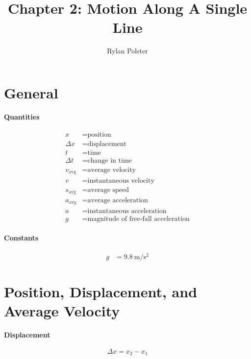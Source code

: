 \documentclass{article}
\title{Chapter 2: Motion Along A Single Line}
\author{Rylan Polster}
\begin{document}
    \maketitle
    
    \section*{General}

        \paragraph{Quantities}
        \begin{align}
            x &= \text{position} \nonumber\\
            \Delta x &= \text{displacement} \nonumber\\
            t &= \text{time} \nonumber\\
            \Delta t &= \text{change in time} \nonumber\\
            v_{\text{avg}} &= \text{average velocity} \nonumber\\
            v &= \text{instantaneous velocity} \nonumber\\
            s_{\text{avg}} &= \text{average speed} \nonumber\\
            a_{\text{avg}} &= \text{average acceleration} \nonumber\\
            a &= \text{instantaneous acceleration} \nonumber\\
            g &= \text{magnitude of free-fall acceleration} \nonumber
        \end{align}

        \paragraph{Constants}
        \begin{align}
            g &= \SI[per-mode=symbol]{9.8}{\meter\per\square\second} \nonumber
        \end{align}

    \section{Position, Displacement, and Average Velocity}

        \paragraph{Displacement}
        \begin{equation}
            \Delta x = x_2 - x_1
        \end{equation}
\end{document}
